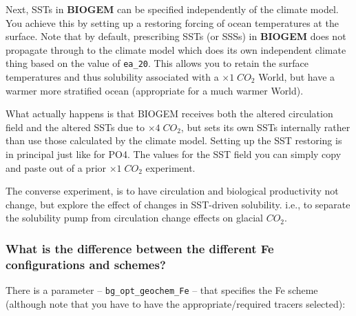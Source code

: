 \documentclass[11pt,fleqn]{book} %
\begin{document}
Next, SSTs in \textbf{BIOGEM} can be specified independently of the climate model. You achieve this by setting up a restoring forcing of ocean temperatures at the surface. Note that by default, prescribing SSTs (or SSSs) in \textbf{BIOGEM} does not propagate through to the climate model which does its own independent climate thing based on the value of \texttt{ea\_20}. This allows you to retain the surface temperatures and thus solubility associated with a \(\times  1\;CO_{2}\) World, but have a warmer more stratified ocean (appropriate for a much warmer World).

What actually happens is that BIOGEM receives both the altered circulation field and the altered SSTs due to \(\times  4\;CO_{2}\), but sets its own SSTs internally rather than use those calculated by the climate model. Setting up the SST restoring is in principal just like for PO4. The values for the SST field you can simply copy and paste out of a prior \(\times  1\;CO_{2}\) experiment.

The converse experiment, is to have circulation and biological productivity not change, but explore the effect of changes in SST-driven solubility. i.e., to separate the solubility pump from circulation change effects on glacial \(CO_{2}\).

%
\subsubsection{What is the difference between the different Fe configurations and schemes?}

There is a parameter -- \texttt{bg\_opt\_geochem\_Fe} -- that specifies the Fe scheme (although note that you have to have the appropriate/required tracers selected):
\end{document}

